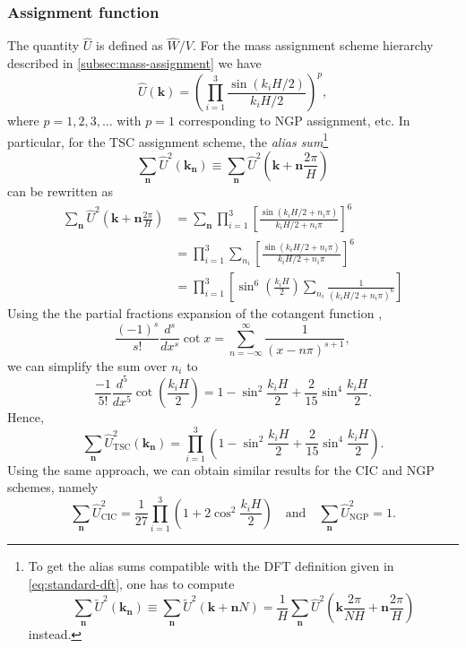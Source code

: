 \subsubsection{Assignment function}
The quantity $\hat{U}$ is defined as $\hat{W}/V$.
For the mass assignment scheme hierarchy described in \autoref{subsec:mass-assignment} we have
\begin{equation*}
    \hat{U}(\mathbf{k}) = \left(\prod_{i=1}^{3}\frac{\sin(k_i H / 2)}{k_i H / 2}\right)^{p},
\end{equation*}
where $p=1,2,3,\dots$ with $p=1$ corresponding to NGP assignment, etc.
In particular, for the TSC assignment scheme, the \textit{alias sum}\footnote{
    To get the alias sums compatible with the DFT definition given in \autoref{eq:standard-dft}, one has to compute
    \begin{equation*}
        \sum_{\mathbf{n}} \tilde{U}^2(\mathbf{k}_\mathbf{n})
        \equiv \sum_\mathbf{n}\tilde{U}^2(\mathbf{k}+\mathbf{n}N)
        = \frac{1}{H}\sum_\mathbf{n}\hat{U}^2\left(\mathbf{k}\frac{2\pi}{NH}+\mathbf{n}\frac{2\pi}{H}\right)
    \end{equation*}
    instead.
}
\begin{equation*}
    \sum_{\mathbf{n}}\hat{U}^2(\mathbf{k}_\mathbf{n})
    \equiv \sum_{\mathbf{n}}\hat{U}^2\left(\mathbf{k} + \mathbf{n}\frac{2\pi}{H}\right)
\end{equation*}
can be rewritten as
\begin{align*}
    \sum_{\mathbf{n}} \hat{U}^2\left(\mathbf{k}+\mathbf{n}\frac{2\pi}{H}\right)
     & = \sum_{\mathbf{n}} \prod_{i=1}^{3} \left[ \frac{\sin(k_i H/2 + n_i\pi)}{k_i H/2 + n_i\pi} \right]^6 \\
     & = \prod_{i=1}^{3} \sum_{n_i} \left[ \frac{\sin(k_i H/2 + n_i \pi)}{k_i H/2 + n_i \pi} \right]^6      \\
     & = \prod_{i=1}^{3} \left[ \sin^6\left(\frac{k_i H}{2}\right)
        \sum_{n_i} \frac{1}{(k_i H/2 + n_i \pi)^6} \right]
\end{align*}
Using the the partial fractions expansion of the cotangent function \cite{aigner2018proofs},
\begin{equation*}
    \frac{(-1)^s}{s!}\frac{d^s}{dx^s}\cot x = \sum_{n=-\infty}^{\infty} \frac{1}{(x-n\pi)^{s+1}},
\end{equation*}
we can simplify the sum over $n_i$ to
\begin{equation*}
    \frac{-1}{5!} \frac{d^5}{dx^5}\cot\left( \frac{k_i H}{2} \right)
    = 1 - \sin^2\frac{k_i H}{2} + \frac{2}{15}\sin^4\frac{k_i H}{2}.
\end{equation*}
Hence,
\begin{equation*}
    \sum_{\mathbf{n}}\hat{U}_\text{TSC}^2(\mathbf{k}_\mathbf{n})
    = \prod_{i=1}^{3} \left(1 - \sin^2\frac{k_i H}{2} + \frac{2}{15}\sin^4\frac{k_i H}{2}\right).
\end{equation*}
Using the same approach, we can obtain similar results for the CIC and NGP schemes, namely
\begin{equation*}
    \sum_{\mathbf{n}}\hat{U}_\text{CIC}^2 = \frac{1}{27} \prod_{i=1}^{3} \left(1 + 2\cos^2\frac{k_i H}{2}\right)
    \quad \text{and} \quad
    \sum_{\mathbf{n}}\hat{U}_\text{NGP}^2 = 1.
\end{equation*}

